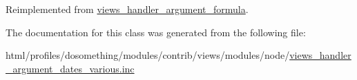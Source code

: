 Reimplemented from \hyperlink{classviews__handler__argument__formula_a01284402427de2bcfa1b1da5792a2332}{views\_\-handler\_\-argument\_\-formula}.

The documentation for this class was generated from the following file:\begin{DoxyCompactItemize}
\item 
html/profiles/dosomething/modules/contrib/views/modules/node/\hyperlink{views__handler__argument__dates__various_8inc}{views\_\-handler\_\-argument\_\-dates\_\-various.inc}\end{DoxyCompactItemize}
